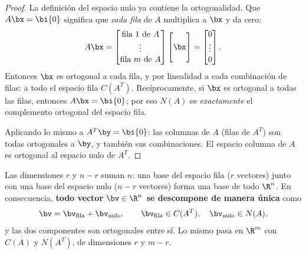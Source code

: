 \begin{proof}
La definición del espacio nulo ya contiene la ortogonalidad. Que
$A\bx=\bi{0}$ significa que \emph{cada fila} de $A$ multiplica a $\bx$ y da
cero:
\[
A\bx=
\begin{bmatrix}\text{fila }1\text{ de }A\\ \vdots\\ \text{fila }m\text{ de }A
\end{bmatrix}
\begin{bmatrix}\ \\ \bx\\ \ \end{bmatrix}
=\begin{bmatrix}0\\\vdots\\0\end{bmatrix}.
\]
Entonces $\bx$ es ortogonal a cada fila, y por linealidad a cada combinación
de filas: a todo el espacio fila $C(A^T)$. Recíprocamente, si $\bx$ es
ortogonal a todas las filas, entonces $A\bx=\bi{0}$; por eso $N(A)$ es
\emph{exactamente} el complemento ortogonal del espacio fila.

Aplicando lo mismo a $A^T\by=\bi{0}$: las columnas de $A$ (filas de
$A^T$) son todas ortogonales a $\by$, y también sus combinaciones. El
espacio columna de $A$ es ortogonal al espacio nulo de $A^T$.
\end{proof}

\begin{observacion}
Las dimensiones $r$ y $n-r$ suman $n$: una base del espacio fila ($r$
vectores) junto con una base del espacio nulo ($n-r$ vectores) forma una base
de todo $\R^n$. En consecuencia, \textbf{todo vector $\bv\in\R^n$ se
descompone de manera única} como
\[
\bv=\bv_{\text{fila}}+\bv_{\text{nulo}},
\qquad \bv_{\text{fila}}\in C(A^T),\quad \bv_{\text{nulo}}\in N(A),
\]
y las dos componentes son ortogonales entre sí. Lo mismo pasa en $\R^m$ con
$C(A)$ y $N(A^T)$, de dimensiones $r$ y $m-r$.
\end{observacion}

